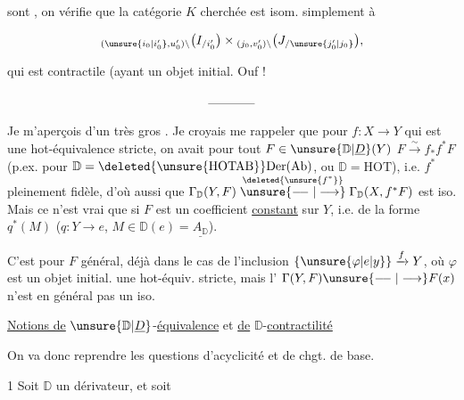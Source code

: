 
sont , on vérifie que la catégorie $K$ cherchée est  isom. simplement à

\[
{}_{(\unsure{i_0|i'_0},u'_0)\backslash}\bigl(I_{/i'_0}\bigr)\times{}_{(j_0,v'_0)\backslash}\bigl(J_{/\unsure{j'_0|j_0}}\bigr),
\]

qui est contractile (ayant un objet  initial. \qquad Ouf !

\[ \rule{1.3cm}{0.4pt} \]

Je m'aperçois d'un très gros . Je croyais me rappeler que pour $f:X\longrightarrow Y$ qui est une hot-équivalence stricte, on avait pour tout $F\in\unsure{\mathbb D|\underline D}(Y)$ $F\xrightarrow{\sim}f_*f^*F$ (p.ex. pour $\mathbb D=\deleted{\unsure{\mathrm{HOTAB}}}\mathrm{Der}(\mathrm{Ab})$, ou $\mathbb D=\mathrm{HOT}$), i.e. $f^*$ pleinement fidèle,  d'où aussi que $\Gamma_{\mathbb D}(Y,F)\mathrel{\overset{\deleted{\unsure{f^*}}}{\unsure{\relbar\joinrel\relbar|\longrightarrow}}}\Gamma_{\mathbb D}(X,f^*F)$ est iso. Mais  ce  n'est vrai que si $F$ est un coefficient \uline{constant} sur $Y$, i.e. de la forme $q^*(M)$ ($q:Y\longrightarrow e$, $M\in\mathbb D(e)=\underline{A_{\mathbb D}}$).

C'est  pour $F$ général, déjà dans le cas de l'inclusion $\{\unsure{\varphi|e|y}\}\xrightarrow{f}Y$, où $\varphi$ est un objet initial.   une hot-équiv. stricte, mais  l' $\Gamma(Y,F)\unsure{\relbar\joinrel\relbar|\longrightarrow}F(x)$ n'est  en général pas un iso.

 \uline{Notions de} $\unsure{\mathbb D|\underline D}$-\uline{équivalence} et \uline{de} $\mathbb D$-\uline{contractilité}

On va donc reprendre les questions d'acyclicité et de chgt. de base.

 1 Soit $\mathbb D$ un dérivateur, et soit


